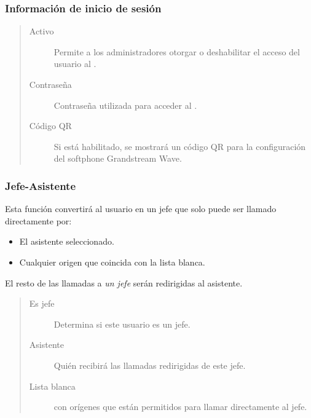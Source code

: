 \documentclass[letterpaper,10pt,spanish]{sphinxmanual}
\begin{document}
\subsubsection{Información de inicio de sesión}
\label{administration_portal/client/vpbx/users:login-info}\begin{quote}
\begin{description}
\item[{Activo}] \leavevmode
Permite a los administradores otorgar o deshabilitar el acceso del usuario al {\hyperref[user_portal/index:userportal]{}}.

\item[{Contraseña}] \leavevmode
Contraseña utilizada para acceder al {\hyperref[user_portal/index:userportal]{}}.

\item[{Código QR}] \leavevmode
Si está habilitado, se mostrará un código QR para la configuración del softphone Grandstream Wave.

\end{description}
\end{quote}


\subsubsection{Jefe-Asistente}
\label{administration_portal/client/vpbx/users:boss-assistant}
Esta función convertirá al usuario en un jefe que solo puede ser llamado directamente por:
\begin{itemize}
\item {} 
El asistente seleccionado.

\item {} 
Cualquier origen que coincida con la lista blanca.

\end{itemize}

El resto de las llamadas a \emph{un jefe} serán redirigidas al asistente.
\begin{quote}
\begin{description}
\item[{Es jefe}] \leavevmode
Determina si este usuario es un jefe.

\item[{Asistente}] \leavevmode
Quién recibirá las llamadas redirigidas de este jefe.

\item[{Lista blanca}] \leavevmode
{\hyperref[administration_portal/client/vpbx/routing_tools/match_lists:match\string-lists]{}} con orígenes que están permitidos para llamar directamente al jefe.

\end{description}
\end{quote}
\end{document}
